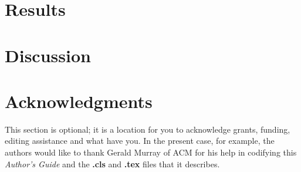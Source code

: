\documentclass{sig-alternate-05-2015}
\begin{document}
\section{Results}

\section{Discussion}



\section{Acknowledgments}
This section is optional; it is a location for you
to acknowledge grants, funding, editing assistance and
what have you.  In the present case, for example, the
authors would like to thank Gerald Murray of ACM for
his help in codifying this \textit{Author's Guide}
and the \textbf{.cls} and \textbf{.tex} files that it describes.

%

%
%

\end{document}
